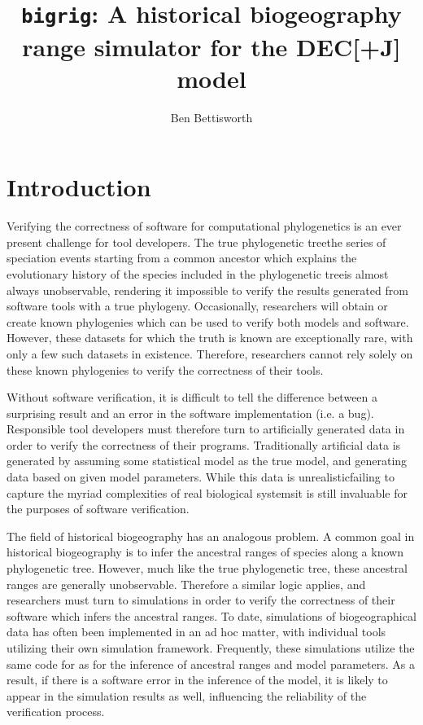 \documentclass{article}
\title{\texttt{bigrig}: A historical biogeography range simulator for the
	DEC[+J] model}
\author{Ben Bettisworth}
\begin{document}
\newcommand{\CountFull}[1]{|#1|_\text{full}}
\newcommand{\CountEmpty}[1]{|#1|_\text{empty}}
\newcommand{\bigrig}{\texttt{bigrig}}

\maketitle

\section{Introduction}

Verifying the correctness of software for computational phylogenetics is an ever
present challenge for tool developers. 
The true phylogenetic tree\textemdash the series of speciation events starting
from a common ancestor which explains the evolutionary history of the species
included in the phylogenetic tree\textemdash is almost always unobservable,
rendering it impossible to verify the results generated from software tools
with a true phylogeny.
Occasionally, researchers will obtain or create known
phylogenies\cite{hillis_experimental_1992} which can be used to verify both
models and software. 
However, these datasets for which the truth is known are exceptionally rare, with
only a few such datasets in existence.
Therefore, researchers cannot rely solely on these known phylogenies to
verify the correctness of their tools.

Without software verification, it is difficult to tell the difference
between a surprising result and an error in the software implementation (i.e. a
bug).
Responsible tool developers must therefore turn to artificially generated data
in order to verify the correctness of their programs.
Traditionally artificial data is generated by assuming some statistical model
as the true model, and generating data based on given model parameters.
While this data is unrealistic\cite{trost_simulations_2024}\textemdash failing to
capture the myriad complexities of real biological systems\textemdash it is
still invaluable for the purposes of software verification.

The field of historical biogeography has an analogous problem.
A common goal in historical biogeography is to infer the ancestral ranges
of species along a known phylogenetic tree.
However, much like the true phylogenetic tree, these ancestral ranges are
generally unobservable.
Therefore a similar logic applies, and researchers must turn to simulations in
order to verify the correctness of their software which infers the ancestral
ranges.
To date, simulations of biogeographical data has often been implemented in an ad
hoc matter, with individual tools utilizing their own simulation
framework\cite{matzke_statistical_2022, bettisworth_lagrange-ng_2023}.
Frequently, these simulations utilize the same code for as for the inference of
ancestral ranges and model parameters.
As a result, if there is a software error in the inference of the model, it is
likely to appear in the simulation results as well, influencing the reliability
of the verification process.
\end{document}
